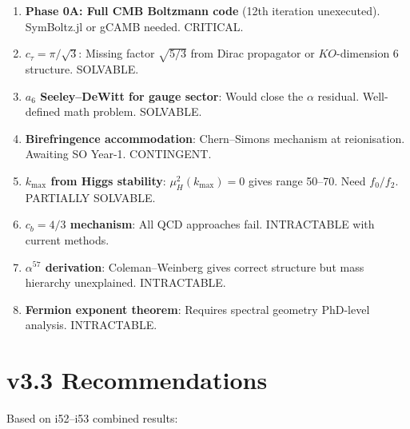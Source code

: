 \documentclass[11pt,a4paper]{article}
\begin{document}
\begin{enumerate}[label=\textbf{P\arabic*.}]
\item \textbf{Phase 0A: Full CMB Boltzmann code} (12th iteration unexecuted). SymBoltz.jl or gCAMB needed. CRITICAL.
\item \textbf{$c_\tau = \pi/\sqrt{3}$}: Missing factor $\sqrt{5/3}$ from Dirac propagator or $KO$-dimension 6 structure. SOLVABLE.
\item \textbf{$a_6$ Seeley--DeWitt for gauge sector}: Would close the $\alpha$ residual. Well-defined math problem. SOLVABLE.
\item \textbf{Birefringence accommodation}: Chern--Simons mechanism at reionisation. Awaiting SO Year-1. CONTINGENT.
\item \textbf{$k_{\max}$ from Higgs stability}: $\mu_H^2(k_{\max}) = 0$ gives range 50--70. Need $f_0/f_2$. PARTIALLY SOLVABLE.
\item \textbf{$c_b = 4/3$ mechanism}: All QCD approaches fail. INTRACTABLE with current methods.
\item \textbf{$\alpha^{57}$ derivation}: Coleman--Weinberg gives correct structure but mass hierarchy unexplained. INTRACTABLE.
\item \textbf{Fermion exponent theorem}: Requires spectral geometry PhD-level analysis. INTRACTABLE.
\end{enumerate}


\section{v3.3 Recommendations}
\label{sec:v33}

Based on i52--i53 combined results:
\end{document}
